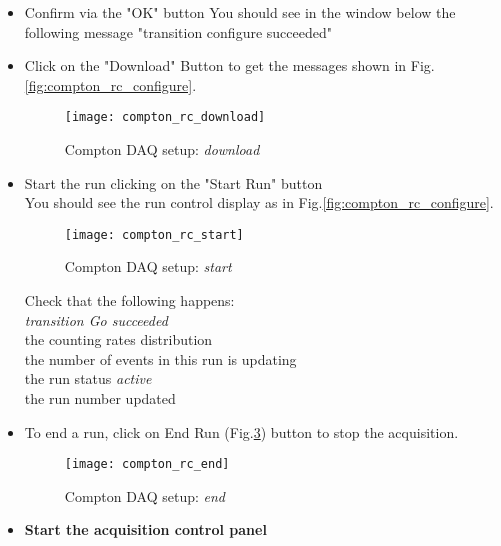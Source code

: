 {{\begin{itemize}
\item Confirm via the "OK" button
You should see in the window below the following message "transition
configure succeeded"
\item Click on the "Download" Button to get the  messages shown in 
Fig.\ref{fig:compton_rc_configure}. \\
\begin{figure}[htp]
    \begin{center}
        \texttt{[image: compton\_rc\_download]}
    \end{center}
    \caption[compton:runcontrol download]{Compton DAQ setup: {\it download} }
    \label{fig:compton_rc_download}
\end{figure}
\item Start the run clicking on the "Start Run" button\\
You should see the run control display as in 
Fig.\ref{fig:compton_rc_configure}. \\
\begin{figure}[htp]
    \begin{center}
        \texttt{[image: compton\_rc\_start]}
    \end{center}
    \caption[compton:runcontrol start run]{Compton DAQ setup: {\it start} }
    \label{fig:compton_rc_start}
\end{figure}
Check that the following happens:\\
{\it transition Go succeeded}\\
the counting rates distribution\\
the number of events in this run is updating\\
the run status {\it active}\\
the run number updated\\

\item To end a run, click on End Run (Fig.\ref{fig:compton_rc_end}) button to stop the acquisition.
\begin{figure}[htp]
    \begin{center}
        \texttt{[image: compton\_rc\_end]}
    \end{center}
    \caption[compton:runcontrol end run]{Compton DAQ setup: {\it end} }
    \label{fig:compton_rc_end}
\end{figure}

\newpage
\item {\bf Start the acquisition control panel}\\


\end{itemize}}}
